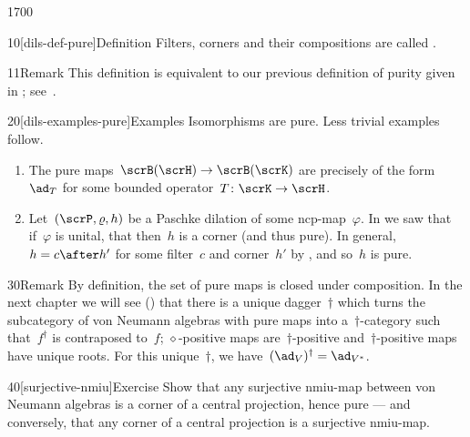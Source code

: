 \begin{parsec}{1700}%
\begin{point}{10}[dils-def-pure]{Definition}%
    Filters, corners and their compositions are called .
\begin{point}{11}{Remark}%
This definition is equivalent to our previous definition
    of purity given in \cite[dfn.~21]{wwpaschke};
    see~.
\end{point}
\end{point}
\begin{point}{20}[dils-examples-pure]{Examples}%
Isomorphisms are pure.  Less trivial examples follow.
\begin{enumerate}
\item
The pure maps~$\scrB(\scrH) \to \scrB(\scrK)$
    are precisely of the form~$\ad_T$
    for some bounded operator~$T\colon \scrK \to \scrH$.
\item
Let~$(\scrP, \varrho, h)$ be a Paschke dilation of some ncp-map~$\varphi$.
In  we saw that if~$\varphi$ is unital,
        that then~$h$ is a corner (and thus pure).
In general, $h = c \after h'$ for some filter~$c$ and corner~$h'$
    by ,
        and so~$h$ is pure.
\end{enumerate}
\spacingfix{}
\end{point}
\begin{point}{30}{Remark}%
By definition, the set of pure maps is closed under composition.
In the next chapter we will see () that
    there is a unique dagger~$\dagger$
    which turns the subcategory of von Neumann
    algebras with pure maps into a~$\dagger$-category
    such that~$f^\dagger$ is contraposed to~$f$;
            $\diamond$-positive maps are~$\dagger$-positive
            and~$\dagger$-positive maps have unique roots.
For this unique~$\dagger$, we have~$(\ad_V)^\dagger = \ad_{V^*}$.
\end{point}
\begin{point}{40}[surjective-nmiu]{Exercise}%
Show that any surjective nmiu-map between von Neumann algebras
        is a corner of a central projection, hence pure
        --- and conversely,
        that any corner of a central projection is a surjective nmiu-map.
\end{point}
\end{parsec}


